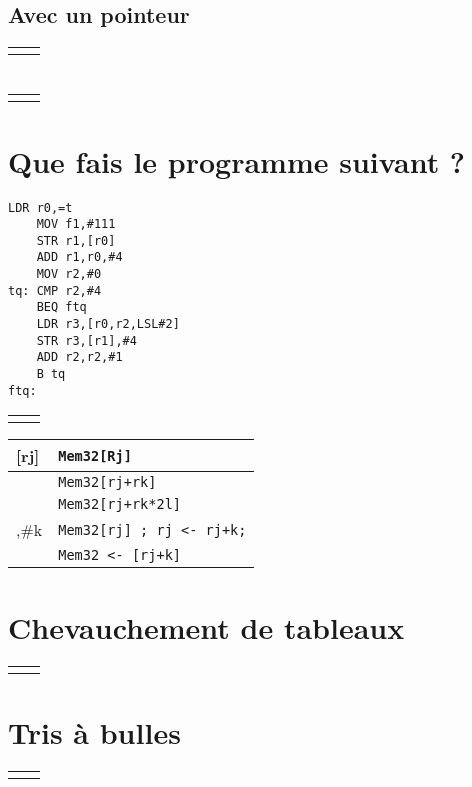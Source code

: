 \documentclass[12pt,a4paper,openany]{book}
\begin{document}
\subsection{Avec un pointeur}
\begin{tabular}{p{6cm}p{6cm}}

	&

\end{tabular}
\section{}
\begin{tabular}{p{6cm}p{6cm}}

	&

\end{tabular}
\section{Que fais le programme suivant ? }
\begin{lstlisting}[language=ARM]
	LDR r0,=t
	MOV f1,#111
	STR r1,[r0]
	ADD r1,r0,#4
	MOV r2,#0
tq: CMP r2,#4
	BEQ ftq
	LDR r3,[r0,r2,LSL#2]
	STR r3,[r1],#4
	ADD r2,r2,#1
	B tq
ftq:
\end{lstlisting}
\begin{tabular}{p{6cm}p{6cm}}

	&

\end{tabular}
\begin{tabular}{l l}
	[rj] & \texttt{Mem32[Rj]}\\
	\hline
	[rj,rk] & \texttt{Mem32[rj+rk]}\\
	\hline
	[rj,rk,LSL\#l] & \texttt{Mem32[rj+rk*2l]}\\
	\hline
	[rj],\#k & \texttt{Mem32[rj] ; rj <- rj+k;}\\
	\hline
	[rj,\#k] & \texttt{Mem32 <- [rj+k]}\\
\end{tabular}
\section{Chevauchement de tableaux}
\begin{tabular}{p{6cm}p{6cm}}

	&

\end{tabular}
\section{Tris à bulles}
\begin{tabular}{p{6cm}p{6cm}}

	&

\end{tabular}
\end{document}
